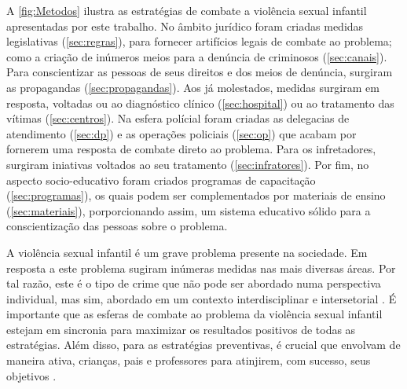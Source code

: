 A \autoref{fig:Metodos} ilustra as estratégias de combate a violência sexual infantil apresentadas por este trabalho. No âmbito jurídico foram criadas medidas legislativas (\autoref{sec:regras}), para fornecer artifícios legais de combate ao problema; como a criação de inúmeros meios para a denúncia de criminosos (\autoref{sec:canais}). Para conscientizar as pessoas de seus direitos e dos meios de denúncia, surgiram as propagandas (\autoref{sec:propagandas}). Aos já molestados, medidas surgiram em resposta, voltadas ou ao diagnóstico clínico (\autoref{sec:hospital}) ou ao tratamento das vítimas (\autoref{sec:centros}). Na esfera polícial foram criadas as delegacias de atendimento (\autoref{sec:dp}) e as operações policiais (\autoref{sec:op}) que acabam por fornerem uma resposta de combate direto ao problema. Para os infretadores, surgiram iniativas voltados ao seu tratamento  (\autoref{sec:infratores}). Por fim, no aspecto socio-educativo foram criados programas de capacitação (\autoref{sec:programas}), os quais podem ser complementados por materiais de ensino (\autoref{sec:materiais}), porporcionando assim, um sistema educativo sólido para a conscientização das pessoas sobre o problema. 

\vspace{-0.35cm}

A violência sexual infantil é um grave problema presente na sociedade. Em resposta a este problema sugiram inúmeras medidas nas mais diversas áreas. Por tal razão, este é o tipo de crime que não pode ser abordado numa perspectiva individual, mas sim, abordado em um contexto interdisciplinar e intersetorial \cite{maria2010papel, pinto2017avaliaccao}. %
É importante que as esferas de combate ao problema da violência sexual infantil estejam em sincronia para maximizar os resultados positivos de todas as estratégias. Além disso, para as estratégias preventivas, é crucial que envolvam de maneira ativa, crianças, pais
e professores para atinjirem, com sucesso, seus objetivos \cite{dip2016advancing}. 




